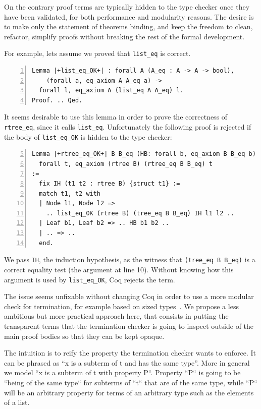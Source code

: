 \documentclass[sigplan,10pt,review]{acmart}\settopmatter{printfolios=true,printccs=false,printacmref=false}
\begin{document}
On the contrary proof terms are typically hidden to the type checker once
they have been validated, for both performance and modularity reasons.
The desire is to make only the statement of theorems binding, and keep
the freedom to clean, refactor, simplify proofs without breaking
the rest of the formal development. 

For example, lets assume we proved that \lstinline+list_eq+ is
correct.

\begin{minipage}{\textwidth}\begin{lstlisting}[numbers=left]
Lemma |+list_eq_OK+| : forall A (A_eq : A -> A -> bool),
    (forall a, eq_axiom A A_eq a) ->
  forall l, eq_axiom A (list_eq A A_eq) l.
Proof. .. Qed.
\end{lstlisting}\end{minipage}

It seems desirable to use this lemma in order to prove the
correctness of \lstinline+rtree_eq+, since it calls
\lstinline+list_eq+.
Unfortunately the following proof is rejected if the body of
\lstinline+list_eq_OK+ is hidden to the type checker:

\begin{minipage}{\textwidth}\begin{lstlisting}[numbers=left,firstnumber=5]
Lemma |+rtree_eq_OK+| B B_eq (HB: forall b, eq_axiom B B_eq b) :
  forall t, eq_axiom (rtree B) (rtree_eq B B_eq) t
:= 
  fix IH (t1 t2 : rtree B) {struct t1} :=
  match t1, t2 with
  | Node l1, Node l2 =>
    .. list_eq_OK (rtree B) (tree_eq B B_eq) IH l1 l2 ..
  | Leaf b1, Leaf b2 => .. HB b1 b2 ..
  | .. => ..
  end.
\end{lstlisting}\end{minipage}

\noindent
We pass \lstinline+IH+, the induction hypothesis, as the
witness that \lstinline+(tree_eq B B_eq)+ is a correct equality test
(the argument at line 10). Without knowing how this argument is used
by \lstinline+list_eq_OK+, Coq rejects the term.

The issue seems unfixable without changing Coq in order to use a more
modular check for termination, for example based on sized
types~\cite{sacchini:pastel-00622429}.
We propose a less ambitious but more practical approach here, that
consists in putting the transparent terms that the termination checker
is going to inspect outside of the main proof bodies so that they can be 
kept opaque.

The intuition is to reify the property the termination checker wants
to enforce. It can be phrased as ``x is a subterm of t and has the same
type''. More in general we model ``x is a subterm of t with property
P``. Property ``P`` is going to be ``being of the same type`` 
for subterms of ``t`` that are of the same type, while ``P`` 
will be an arbitrary property for terms of an arbitrary type such 
as the elements of a list.
\end{document}
